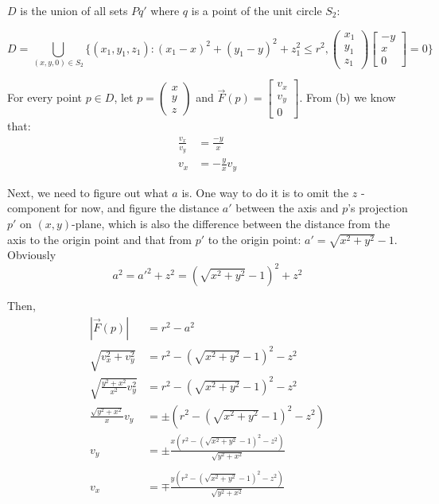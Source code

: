 \begin{exercise}{8}
\begin{enumerate}
    $D$ is the union of all sets $Pq'$ where $q$ is a point of the unit circle $S_2$:

    $$D = \bigcup\limits_{(x, y, 0) \in S_2}
            \{(x_1, y_1, z_1): (x_1 - x)^2 + (y_1 - y)^2 + z_1^2 \leq r^2,
                               \begin{pmatrix}x_1\\y_1\\z_1\end{pmatrix}
                               \begin{bmatrix}-y\\x\\0\end{bmatrix} = 0\}$$
    
    For every point $p \in D$, let $p = \begin{pmatrix}x\\y\\z\end{pmatrix}$ and
    $\vec{F}(p) = \begin{bmatrix}v_x\\v_y\\0\end{bmatrix}$. From (b)
    we know that:
    \begin{align*}
      \frac{v_x}{v_y} &= \frac{-y}{x} \\
                  v_x &= -\frac{y}{x}v_y 
    \end{align*}
    
    Next, we need to figure out what $a$ is. One way to do it is to omit the $z$
    -component for now, and figure the distance $a'$ between the axis and $p$'s
    projection $p'$ on $(x, y)$-plane, which is also the difference between the
    distance from the axis to the origin point and that from $p'$ to the origin
    point: $a' = \sqrt{x^2 + y^2} - 1$. Obviously
    $$a^2 = a'^2 + z^2 = (\sqrt{x^2 + y^2} - 1)^2 + z^2$$


    \def \tmp{(\sqrt{x^2 + y^2} - 1)^2 - z^2}
    Then,
    \begin{align*}
                         |\vec{F}(p)| &= r^2 - a^2 \\
                 \sqrt{v_x^2 + v_y^2} &= r^2 - \tmp \\
      \sqrt{\frac{y^2+x^2}{x^2}v_y^2} &= r^2 - \tmp \\
        \frac{\sqrt{y^2 + x^2}}{x}v_y &= \pm (r^2 - \tmp) \\
      v_y &= \pm \frac{x(r^2 - \tmp)}{\sqrt{y^2 + x^2}} \\ & \\
      v_x &= \mp \frac{y(r^2 - \tmp)}{\sqrt{y^2 + x^2}}
    \end{align*}
    

\end{enumerate}
\end{exercise}
